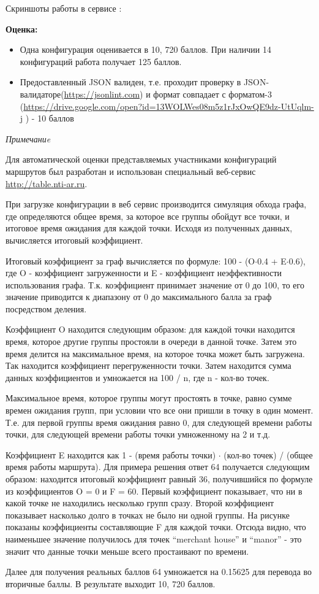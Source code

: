 \inputminted[fontsize=\footnotesize, linenos]{json}{final/command_tour/ar/task_06/source_2.json}

Скриншоты работы в сервисе : 


\textbf{Оценка:}
\begin{itemize}
    \item	Одна конфигурация оценивается в 10, 720 баллов. При наличии 14 конфигураций работа получает 125 баллов.
    \item	Предоставленный JSON валиден, т.е. проходит проверку в JSON-валидаторе(\url{https://jsonlint.com}) и формат совпадает с форматом-3 (\url{https://drive.google.com/open?id=13WOLWes08m5z1rJxOwQE9dz-UtUqlm-j} ) - 10 баллов
\end{itemize}

\textit{Примечаниe}

Для автоматической оценки представляемых участниками конфигураций маршрутов был разработан и использован  специальный веб-сервис \url{http://table.nti-ar.ru}.

При загрузке конфигурации в веб сервис производится симуляция обхода графа, где определяются общее время, за которое все группы обойдут все точки, и итоговое время ожидания для каждой точки. Исходя из полученных данных, вычисляется итоговый коэффициент.

Итоговый коэффициент за граф вычисляется по формуле: 100 - (O$\cdot$0.4 + E$\cdot$0.6), где O - коэффициент загруженности и E - коэффициент неэффективности использования графа. Т.к. коэффициент принимает значение от 0 до 100, то его значение приводится к диапазону от 0 до максимального балла за граф посредством деления.

Коэффициент O находится следующим образом: для каждой точки находится время, которое другие группы простояли в очереди в данной точке. Затем это время делится на максимальное время, на которое точка может быть загружена. Так находится коэффициент перегруженности точки. Затем находится сумма данных коэффициентов и умножается на 100 / n, где n - кол-во точек.

Максимальное время, которое группы могут простоять в точке, равно сумме времен ожидания групп, при условии что все они пришли в точку в один момент. Т.е. для первой группы время ожидания равно 0, для следующей времени работы точки, для следующей времени работы точки умноженному на 2 и т.д.

Коэффициент E находится как 1 - (время работы точки) $\cdot$ (кол-во точек) / (общее время работы маршрута).
Для примера решения ответ 64 получается следующим образом: находится итоговый коэффициент равный 36, получившийся по формуле из коэффициентов O = 0 и F = 60. Первый коэффициент показывает, что ни в какой точке не находились несколько групп сразу. Второй коэффициент показывает насколько долго в точках не было ни одной группы.  На рисунке показаны коэффициенты составляющие F для каждой точки. Отсюда видно, что наименьшее значение получилось для точек “merchant house” и “manor” - это значит что данные точки меньше всего простаивают по времени.


Далее для получения реальных баллов 64 умножается на 0.15625 для перевода во вторичные баллы. В результате выходит 10, 720 баллов. 
